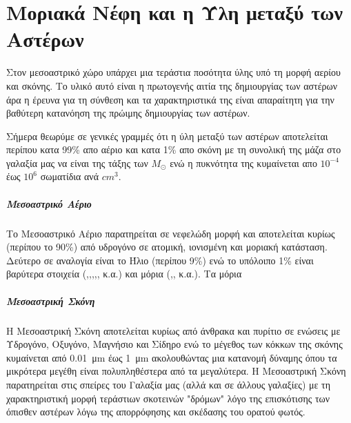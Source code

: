 \documentclass[a4paper,12pt]{memoir}
\newcommand{\sm}{$M_{\odot}$}
\begin{document}
\chapter{Μοριακά Νέφη και η Ύλη μεταξύ των Αστέρων}

Στον μεσοαστρικό χώρο υπάρχει μια τεράστια ποσότητα ύλης  υπό τη μορφή αερίου και σκόνης. Το υλικό αυτό είναι η πρωτογενής αιτία  της δημιουργίας των αστέρων άρα η έρευνα για τη σύνθεση και τα χαρακτηριστικά της είναι απαραίτητη για την βαθύτερη κατανόηση της πρώιμης  δημιουργίας των αστέρων.

Σήμερα θεωρύμε σε γενικές γραμμές ότι η ύλη μεταξύ των αστέρων αποτελείται περίπου κατα 99\% απο αέριο και κατα 1\% απο σκόνη με τη συνολική της μάζα στο γαλαξία μας να είναι της τάξης των \sm {} ενώ η πυκνότητα της κυμαίνεται απο $10^{-4}$ έως $10^{6}$ σωματίδια ανά $cm^3$.

\paragraph{Μεσοαστρικό Αέριο} 
Το Μεσοαστρικό Αέριο παρατηρείται σε νεφελώδη μορφή και αποτελείται κυρίως (περίπου το 90\%) από υδρογόνο σε ατομική, ιονισμένη και μοριακή κατάσταση. Δεύτερο σε αναλογία είναι το Ήλιο (περίπου 9\%) ενώ το υπόλοιπο 1\% είναι βαρύτερα στοιχεία (,,,,, κ.α.) και μόρια (,, κ.α.).
Τα μόρια 

\paragraph{Μεσοαστρική Σκόνη}
Η Μεσοαστρική Σκόνη αποτελείται κυρίως από άνθρακα και πυρίτιο σε ενώσεις με Υδρογόνο, Οξυγόνο, Μαγνήσιο και Σίδηρο ενώ το μέγεθος των κόκκων της σκόνης κυμαίνεται από \SI{0.01}{\micro\meter} έως \SI{1}{\micro\meter} ακολουθώντας μια κατανομή δύναμης όπου τα μικρότερα μεγέθη είναι πολυπληθέστερα από τα μεγαλύτερα. 
Η Μεσοαστρική Σκόνη παρατηρείται στις σπείρες του Γαλαξία μας (αλλά και σε άλλους γαλαξίες) με τη χαρακτηριστική μορφή τεράστιων σκοτεινών "δρόμων" λόγο της επισκότισης των όπισθεν αστέρων λόγω της απορρόφησης και σκέδασης του ορατού φωτός.
\end{document}
